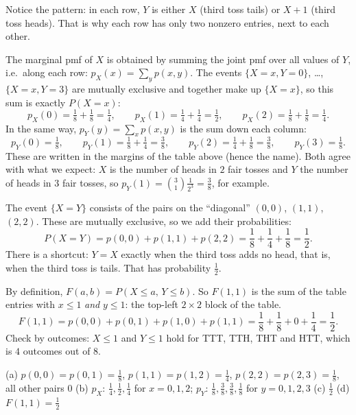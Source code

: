 \begin{solution}
	Notice the pattern: in each row, $Y$ is either $X$ (third toss tails) or
	$X+1$ (third toss heads). That is why each row has only two nonzero
	entries, next to each other.

	 The marginal pmf of $X$ is obtained by summing the joint pmf
	over all values of $Y$, i.e.\ along each row:
	$p_X(x)=\sum_y p(x,y)$. The events $\{X=x,Y=0\}$, \dots, $\{X=x,Y=3\}$ are
	mutually exclusive and together make up $\{X=x\}$, so this sum is exactly
	$P(X=x)$:
	\[
		p_X(0)=\tfrac18+\tfrac18=\tfrac14,\qquad
		p_X(1)=\tfrac14+\tfrac14=\tfrac12,\qquad
		p_X(2)=\tfrac18+\tfrac18=\tfrac14.
	\]
	In the same way, $p_Y(y)=\sum_x p(x,y)$ is the sum down each column:
	\[
		p_Y(0)=\tfrac18,\qquad
		p_Y(1)=\tfrac18+\tfrac14=\tfrac38,\qquad
		p_Y(2)=\tfrac14+\tfrac18=\tfrac38,\qquad
		p_Y(3)=\tfrac18.
	\]
	These are written in the margins of the table above (hence the name).
	Both agree with what we expect: $X$ is the number of heads in $2$ fair
	tosses and $Y$ the number of heads in $3$ fair tosses, so
	$p_Y(1)=\binom31\frac1{2^3}=\frac38$, for example.

	 The event $\{X=Y\}$ consists of the pairs on the ``diagonal''
	$(0,0)$, $(1,1)$, $(2,2)$. These are mutually exclusive, so we add their
	probabilities:
	\[
		P(X=Y)=p(0,0)+p(1,1)+p(2,2)=\frac18+\frac14+\frac18=\frac12.
	\]
	There is a shortcut: $Y=X$ exactly when the third toss adds no head, that
	is, when the third toss is tails. That has probability $\frac12$.

	 By definition, $F(a,b)=P(X\le a,\,Y\le b)$. So $F(1,1)$ is the
	sum of the table entries with $x\le1$ \emph{and} $y\le1$: the top-left
	$2\times2$ block of the table.
	\[
		F(1,1)=p(0,0)+p(0,1)+p(1,0)+p(1,1)=\frac18+\frac18+0+\frac14=\frac12.
	\]
	Check by outcomes: $X\le1$ and $Y\le1$ hold for TTT, TTH, THT and HTT,
	which is $4$ outcomes out of $8$.

	\begin{answer}
		(a) $p(0,0)=p(0,1)=\frac18$, $p(1,1)=p(1,2)=\frac14$,
		$p(2,2)=p(2,3)=\frac18$, all other pairs $0$ \quad
		(b) $p_X$: $\frac14,\frac12,\frac14$ for $x=0,1,2$;
		$p_Y$: $\frac18,\frac38,\frac38,\frac18$ for $y=0,1,2,3$ \quad
		(c) $\frac12$ \quad
		(d) $F(1,1)=\frac12$
	\end{answer}
\end{solution}
